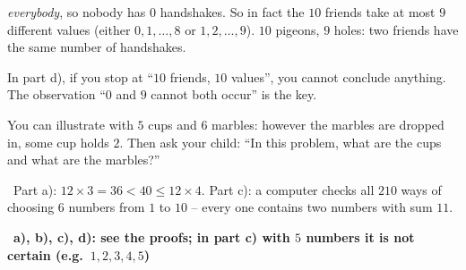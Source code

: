 \documentclass[11pt]{article}
\providecommand{\AnsWord}{Đáp số}
\newcommand{\ans}[1]{\par\smallskip{\bfseries\color{tmGreen!88!black}\AnsWord:}\ {\bfseries\color{AnsRed}#1}\par}
\newcommand{\verify}[1]{\par\smallskip\noindent{\bfseries\color{tmGreen!80!black}\faCheckCircle\ \CheckWord}\ #1\par}
\def\AnsWord{Answer}
\def\CheckWord{Check:}
\begin{document}
{\begin{proofbox}
\emph{everybody}, so nobody has $0$ handshakes. So in fact the $10$ friends take at most $9$ different values (either $0, 1, \dots, 8$ or
$1, 2, \dots, 9$). $10$ pigeons, $9$ holes: two friends have the same number of handshakes.\end{proofbox}
\begin{warnbox}In part d), if you stop at ``$10$ friends, $10$ values'', you cannot conclude anything. The observation ``$0$ and $9$ cannot
both occur'' is the key.\end{warnbox}
\begin{parentbox}You can illustrate with $5$ cups and $6$ marbles: however the marbles are dropped in, some cup holds $2$. Then ask your
child: ``In this problem, what are the cups and what are the marbles?''\end{parentbox}
\verify{Part a): $12\times 3 = 36 < 40 \le 12\times 4$. Part c): a computer checks all $210$ ways of choosing $6$ numbers from $1$ to $10$
-- every one contains two numbers with sum $11$.}
\ans{a), b), c), d): see the proofs; in part c) with $5$ numbers it is not certain (e.g.\ $1, 2, 3, 4, 5$)}
}
\end{document}
